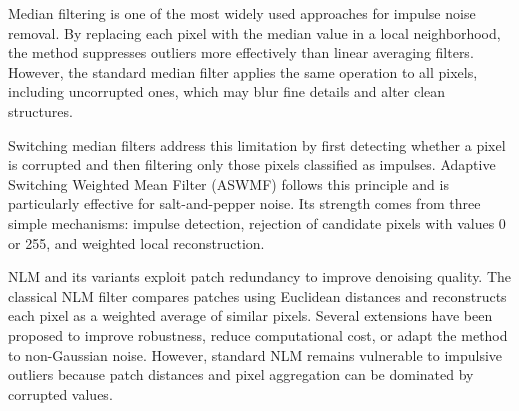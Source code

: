 \documentclass{ieeeaccess}
\begin{document}
Median filtering is one of the most widely used approaches for impulse noise removal. By replacing each pixel with the median value in a local neighborhood, the method suppresses outliers more effectively than linear averaging filters. However, the standard median filter applies the same operation to all pixels, including uncorrupted ones, which may blur fine details and alter clean structures.

Switching median filters address this limitation by first detecting whether a pixel is corrupted and then filtering only those pixels classified as impulses. Adaptive Switching Weighted Mean Filter (ASWMF) follows this principle and is particularly effective for salt-and-pepper noise. Its strength comes from three simple mechanisms: impulse detection, rejection of candidate pixels with values 0 or 255, and weighted local reconstruction.

NLM and its variants exploit patch redundancy to improve denoising quality. The classical NLM filter compares patches using Euclidean distances and reconstructs each pixel as a weighted average of similar pixels. Several extensions have been proposed to improve robustness, reduce computational cost, or adapt the method to non-Gaussian noise. However, standard NLM remains vulnerable to impulsive outliers because patch distances and pixel aggregation can be dominated by corrupted values.
\end{document}
